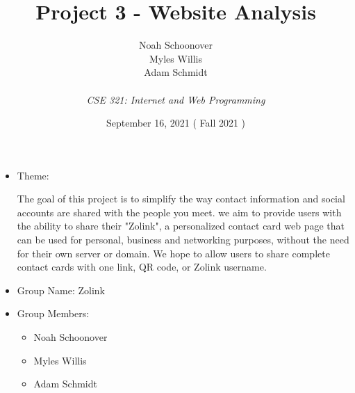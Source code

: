 \documentclass[12pt]{article}%
\def\assignmentName { Project 3 - Website Analysis                      }
\def\className      { CSE 321: Internet and Web Programming             }
\def\studentName    { Noah Schoonover \\ Myles Willis \\ Adam Schmidt   }
\def\studentEmail   {  }
\def\dueDate        { September 16, 2021                                }
\def\semesterDate   { Fall 2021                                         }
\begin{document}


\begin{singlespace}
\title{ \assignmentName }
\author{ \studentName \\ {\small \studentEmail} \\ {\it \className}}
\date{\dueDate (\semesterDate)}
\maketitle
\end{singlespace}



\begin{itemize}
    \item Theme:

    The goal of this project is to simplify the way contact information and social accounts are shared with the people you meet.
    we aim to provide users with the ability to share their "Zolink", a personalized contact card web page that can be used for personal,
    business and networking purposes, without the need for their own server or domain. We hope to allow users to share complete
    contact cards with one link, QR code, or Zolink username.

    \item Group Name: Zolink
    \item Group Members:
    \begin{itemize}
    	\item Noah Schoonover
    	\item Myles Willis
    	\item Adam Schmidt
    \end{itemize}
\end{itemize}
\end{document}
